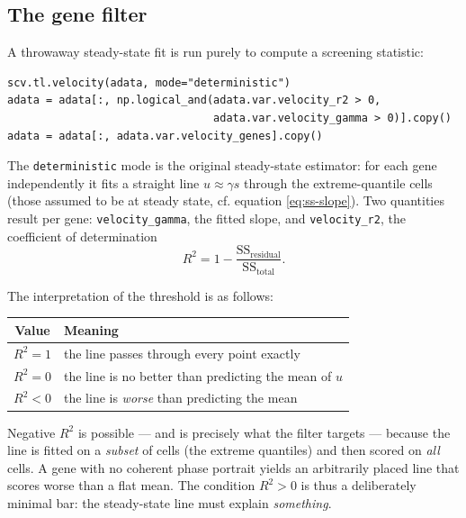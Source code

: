 \documentclass[11pt,a4paper]{article}
\newcommand{\uns}{u}
\newcommand{\spl}{s}
\theoremstyle{definition}
\begin{document}
\subsection{The gene filter}
\label{sec:gene-filter}

A throwaway steady-state fit is run purely to compute a screening statistic:

\begin{lstlisting}
scv.tl.velocity(adata, mode="deterministic")
adata = adata[:, np.logical_and(adata.var.velocity_r2 > 0,
                                adata.var.velocity_gamma > 0)].copy()
adata = adata[:, adata.var.velocity_genes].copy()
\end{lstlisting}

The \texttt{deterministic} mode is the original steady-state estimator: for
each gene independently it fits a straight line $\uns \approx \gamma \spl$
through the extreme-quantile cells (those assumed to be at steady state, cf.
equation \eqref{eq:ss-slope}). Two quantities result per gene:
\texttt{velocity\_gamma}, the fitted slope, and \texttt{velocity\_r2}, the
coefficient of determination
%
\begin{equation}
R^2 = 1 - \frac{\mathrm{SS}_{\text{residual}}}{\mathrm{SS}_{\text{total}}}.
\end{equation}

The interpretation of the threshold is as follows:

\begin{center}
\begin{tabular}{@{}cl@{}}
\toprule
\textbf{Value} & \textbf{Meaning} \\
\midrule
$R^2 = 1$ & the line passes through every point exactly \\
$R^2 = 0$ & the line is no better than predicting the mean of $\uns$ \\
$R^2 < 0$ & the line is \emph{worse} than predicting the mean \\
\bottomrule
\end{tabular}
\end{center}

Negative $R^2$ is possible --- and is precisely what the filter targets ---
because the line is fitted on a \emph{subset} of cells (the extreme quantiles)
and then scored on \emph{all} cells. A gene with no coherent phase portrait
yields an arbitrarily placed line that scores worse than a flat mean. The
condition $R^2 > 0$ is thus a deliberately minimal bar: the steady-state line
must explain \emph{something}.
\end{document}
